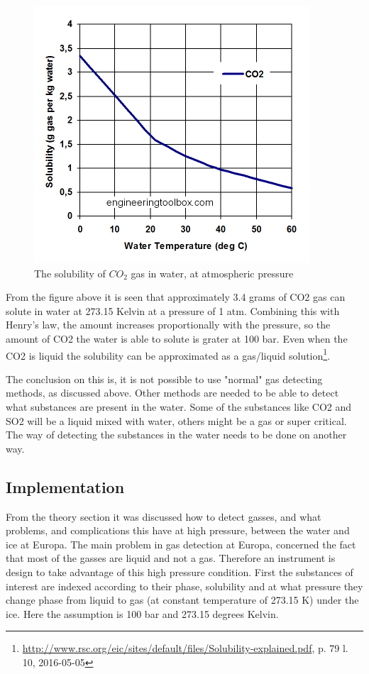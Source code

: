 \begin{figure}[htb]
  \centering
  \includegraphics[scale=0.4]{figures/GasDetectionAgge/CO2Solubility}
  \caption{The solubility of $CO_2$ gas in water, at atmospheric pressure}
\end{figure}

From the figure above it is seen that approximately 3.4 grams of CO2 gas can solute in water at 273.15 Kelvin at a pressure of 1 atm. Combining this with Henry's law, the amount increases proportionally with the pressure, so the amount of CO2 the water is able to solute is grater at 100 bar. Even when the CO2 is liquid the solubility can be approximated as a gas/liquid solution\footnote{\url{http://www.rsc.org/eic/sites/default/files/Solubility-explained.pdf}, p. 79 l. 10, 2016-05-05}.

The conclusion on this is, it is not possible to use "normal" gas detecting methods, as discussed above. Other methods are needed to be able to detect what substances are present in the water. Some of the substances like CO2 and SO2 will be a liquid mixed with water, others might be a gas or super critical. The way of detecting the substances in the water needs to be done on another way.

\subsection{Implementation}

From the theory section it was discussed how to detect gasses, and what problems, and complications this have at high pressure, between the water and ice at Europa. The main problem in gas detection at Europa, concerned the fact that most of the gasses are liquid and not a gas. Therefore an instrument is design to take advantage of this high pressure condition. First the substances of interest are indexed according to their phase, solubility and at what pressure they change phase from liquid to gas (at constant temperature of 273.15 K) under the ice. Here the assumption is 100 bar and 273.15 degrees Kelvin.

